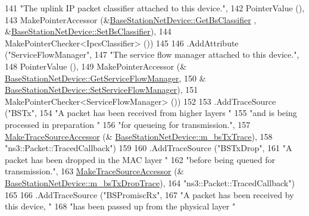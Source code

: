 \begin{DoxyCode}
141                    \textcolor{stringliteral}{"The uplink IP packet classifier attached to this device."},
142                    PointerValue (),
143                    MakePointerAccessor (&\hyperlink{classns3_1_1BaseStationNetDevice_a4d104c6c640aa02fd7005ad38f4ca44f}{BaseStationNetDevice::GetBsClassifier}
      , &\hyperlink{classns3_1_1BaseStationNetDevice_a1299e18f0ae2625402d325b781805e9f}{BaseStationNetDevice::SetBsClassifier}),
144                    MakePointerChecker<IpcsClassifier> ())
145 
146     .AddAttribute (\textcolor{stringliteral}{"ServiceFlowManager"},
147                    \textcolor{stringliteral}{"The service flow manager attached to this device."},
148                    PointerValue (),
149                    MakePointerAccessor (&
      \hyperlink{classns3_1_1BaseStationNetDevice_a16a12a1027391156e044a28534c0eaf2}{BaseStationNetDevice::GetServiceFlowManager},
150                                         &
      \hyperlink{classns3_1_1BaseStationNetDevice_a6ffcef20111ec720cf75953387fef353}{BaseStationNetDevice::SetServiceFlowManager}),
151                    MakePointerChecker<ServiceFlowManager> ())
152 
153     .AddTraceSource (\textcolor{stringliteral}{"BSTx"},
154                      \textcolor{stringliteral}{"A packet has been received from higher layers "}
155                      \textcolor{stringliteral}{"and is being processed in preparation "}
156                      \textcolor{stringliteral}{"for queueing for transmission."},
157                      \hyperlink{group__tracing_gab21a770b9855af4e8f69f7531ea4a6b0}{MakeTraceSourceAccessor} (&
      \hyperlink{classns3_1_1BaseStationNetDevice_af52f29795598ce94f2932d351230b251}{BaseStationNetDevice::m\_bsTxTrace}),
158                      \textcolor{stringliteral}{"ns3::Packet::TracedCallback"})
159 
160     .AddTraceSource (\textcolor{stringliteral}{"BSTxDrop"},
161                      \textcolor{stringliteral}{"A packet has been dropped in the MAC layer "}
162                      \textcolor{stringliteral}{"before being queued for transmission."},
163                      \hyperlink{group__tracing_gab21a770b9855af4e8f69f7531ea4a6b0}{MakeTraceSourceAccessor} (&
      \hyperlink{classns3_1_1BaseStationNetDevice_a476cd66e863b2439f5a007a02805a7dc}{BaseStationNetDevice::m\_bsTxDropTrace}),
164                      \textcolor{stringliteral}{"ns3::Packet::TracedCallback"})
165 
166     .AddTraceSource (\textcolor{stringliteral}{"BSPromiscRx"},
167                      \textcolor{stringliteral}{"A packet has been received by this device, "}
168                      \textcolor{stringliteral}{"has been passed up from the physical layer "}

\end{DoxyCode}
